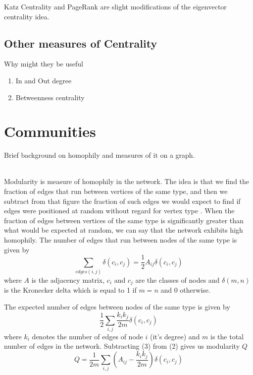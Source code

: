 \documentclass[12pt]{article}
\begin{document}
		Katz Centrality and PageRank are slight modifications of the eigenvector centrality idea.
	
	\subsection{Other measures of Centrality} Why might they be useful
	\begin{enumerate}
	\item In and Out degree
	\item Betweenness centrality
	\end{enumerate}

\section{Communities} Brief background on homophily and measures of it on a graph. \\ \\
	\par Modularity is measure of homophily in the network. The idea is that we find  the fraction of edges that run between vertices of the same type, and then we subtract from that figure the fraction of such edges we would expect to find if edges were positioned at random without regard for vertex type \cite{networkBook}. When the fraction of edges between vertices of the same type is significantly greater than what would be expected at random, we can say that the network exhibits high homophily. The number of edges that run between nodes of the same type is given by
	\begin{equation}
		\sum_{edges (i,j)} \delta (c_i, c_j) = \frac{1}{2} A_{ij} \delta (c_i, c_j)
	\end{equation}
	where $A$ is the adjacency matrix, $c_i$ and $c_j$ are the classes of nodes and $\delta (m,n)$ is the Kronecker delta which is equal to 1 if $m = n$ and 0 otherwise.
	\par The expected number of edges between nodes of the same type is given by
	\begin{equation}
		\frac{1}{2} \sum_{i,j} \frac{k_i k_j}{2m} \delta (c_i,c_j)
	\end{equation}
	where $k_i$ denotes the number of edges of node $i$ (it's degree) and $m$ is the total number of edges in the network. Subtracting (3) from (2) gives us modularity $Q$
	\begin{equation}
		Q = \frac{1}{2m} \sum_{i,j} \left( A_{ij} - \frac{k_i k_j}{2m} \right) \delta (c_i,c_j)
	\end{equation}
	
\end{document}
